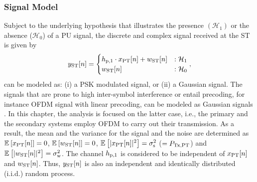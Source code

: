 \subsubsection{Signal Model}
Subject to the underlying hypothesis that illustrates the presence $(\mathcal{H}_1)$ or the absence ($\mathcal{H}_0$) of a PU signal, the discrete and complex signal received at the ST is given by
\begin{equation}
\yrcvd[n] = 
\begin{cases}
\hpo \cdot \xp[n] + \wst[n] & : \mathcal{H}_1 \\
\wst[n] & :\mathcal{H}_0
\end{cases},
\label{eq_IS:sys_mod_p1s}
\end{equation}
 can be modeled as: (i) a PSK  modulated signal, or (ii) a Gaussian signal. The signals that are prone to high inter-symbol interference or entail precoding, for instance OFDM signal with linear precoding, can be modeled as Gaussian signals \cite{Liang08}. In this chapter, the analysis is focused on the latter case, i.e., the primary and the secondary systems employ OFDM to carry out their transmission. 
As a result, the mean and the variance for the signal and the noise are determined as ${\mathbb E}_{}\left[ x_{\text{PT}}[n] \right] = 0$, ${\mathbb E}_{}\left[ w_{\text{ST}}[n] \right] = 0$, ${\mathbb E}_{}\left[ |x_{\text{PT}}[n]|^2 \right] = \sigma^2_{\text{s}}$ ($= P_{\text{Tx,PT}}$) and ${\mathbb E}_{}\left[ |w_{\text{ST}}[n]|^2 \right] = \sigma^2_{\text{w}}$. The channel $h_{\text{p,1}}$ is considered to be independent of $x_{\text{PT}}[n]$ and $w_{\text{ST}}[n]$. Thus, $y_{\text{ST}}[n]$ is also an independent and identically distributed (i.i.d.) random process.


